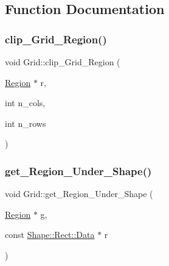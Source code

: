 \subsection{Function Documentation}
\mbox{\label{namespace_grid_a964327026e6d0cdadf17407401d96df7}} 
\subsubsection{\texorpdfstring{clip\+\_\+\+Grid\+\_\+\+Region()}{clip\_Grid\_Region()}}
{\footnotesize\ttfamily void Grid\+::clip\+\_\+\+Grid\+\_\+\+Region (\begin{DoxyParamCaption}\item[{\mbox{\hyperlink{struct_grid_1_1_region}{Region}} $\ast$}]{r,  }\item[{int}]{n\+\_\+cols,  }\item[{int}]{n\+\_\+rows }\end{DoxyParamCaption})}

\mbox{\label{namespace_grid_ab92654ff6a03a22f84957055fbde567c}} 
\subsubsection{\texorpdfstring{get\+\_\+\+Region\+\_\+\+Under\+\_\+\+Shape()}{get\_Region\_Under\_Shape()}}
{\footnotesize\ttfamily void Grid\+::get\+\_\+\+Region\+\_\+\+Under\+\_\+\+Shape (\begin{DoxyParamCaption}\item[{\mbox{\hyperlink{struct_grid_1_1_region}{Region}} $\ast$}]{g,  }\item[{const \mbox{\hyperlink{struct_shape_1_1_rect_1_1_data}{Shape\+::\+Rect\+::\+Data}} $\ast$}]{r }\end{DoxyParamCaption})\hspace{0.3cm}{\ttfamily [inline]}}

\mbox{\label{namespace_grid_a381a9dd7e313111348df0dd65b5e6b4c}} 
